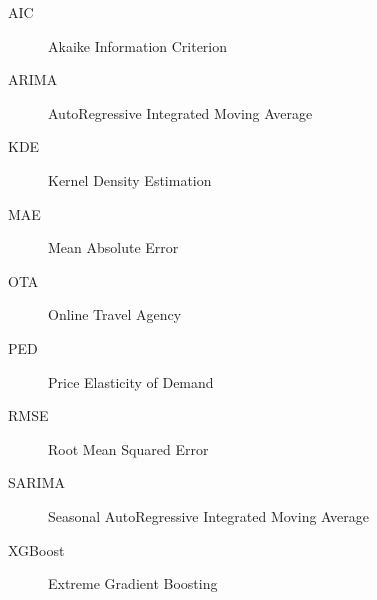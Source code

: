 

\begin{description}
    \item[AIC] Akaike Information Criterion
    \item[ARIMA] AutoRegressive Integrated Moving Average
    \item[KDE] Kernel Density Estimation
    \item[MAE] Mean Absolute Error
    \item[OTA] Online Travel Agency
    \item[PED] Price Elasticity of Demand
    \item[RMSE] Root Mean Squared Error
    \item[SARIMA] Seasonal AutoRegressive Integrated Moving Average
    \item[XGBoost] Extreme Gradient Boosting
\end{description}